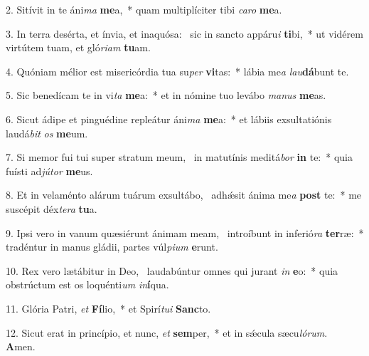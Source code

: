 2. Sitívit in te áni\textit{ma} \textbf{me}a,~*  quam multiplíciter tibi \textit{ca}\textit{ro} \textbf{me}a.\

3. In terra desérta, et ínvia, et inaquósa: \dag\  sic in sancto appáru\textit{i} \textbf{ti}bi,~*  ut vidérem virtútem tuam, et gló\textit{ri}\textit{am} \textbf{tu}am.\

4. Quóniam mélior est misericórdia tua su\textit{per} \textbf{vi}tas:~*  lábia me\textit{a} \textit{lau}\textbf{dá}bunt te.\

5. Sic benedícam te in vi\textit{ta} \textbf{me}a:~*  et in nómine tuo levábo \textit{ma}\textit{nus} \textbf{me}as.\

6. Sicut ádipe et pinguédine repleátur áni\textit{ma} \textbf{me}a:~*  et lábiis exsultatiónis laudá\textit{bit} \textit{os} \textbf{me}um.\

7. Si memor fui tui super stratum meum, \dag\  in matutínis meditá\textit{bor} \textbf{in} te:~*  quia fuísti ad\textit{jú}\textit{tor} \textbf{me}us.\

8. Et in velaménto alárum tuárum exsultábo, \dag\  adhǽsit ánima me\textit{a} \textbf{post} te:~*  me suscépit déx\textit{te}\textit{ra} \textbf{tu}a.\

9. Ipsi vero in vanum quæsiérunt ánimam meam, \dag\  introíbunt in inferió\textit{ra} \textbf{ter}ræ:~*  tradéntur in manus gládii, partes vúl\textit{pi}\textit{um} \textbf{e}runt.\

10. Rex vero lætábitur in Deo, \dag\  laudabúntur omnes qui jurant \textit{in} \textbf{e}o:~*  quia obstrúctum est os loquénti\textit{um} \textit{in}\textbf{í}qua.\

11. Glória Patri, \textit{et} \textbf{Fí}lio,~*  et Spirí\textit{tu}\textit{i} \textbf{Sanc}to.\

12. Sicut erat in princípio, et nunc, \textit{et} \textbf{sem}per,~*  et in sǽcula sæcu\textit{ló}\textit{rum}. \textbf{A}men.\

